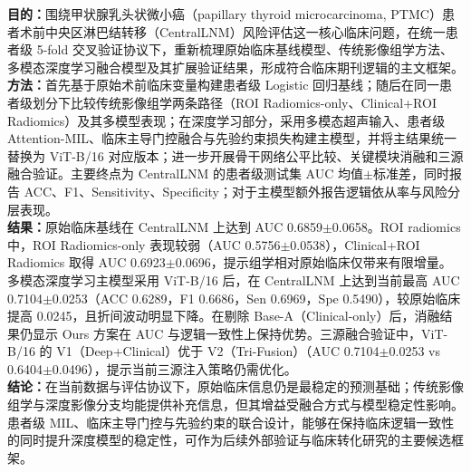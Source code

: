 \textbf{目的：}围绕甲状腺乳头状微小癌（papillary thyroid microcarcinoma, PTMC）患者术前中央区淋巴结转移（CentralLNM）风险评估这一核心临床问题，在统一患者级 5-fold 交叉验证协议下，重新梳理原始临床基线模型、传统影像组学方法、多模态深度学习融合模型及其扩展验证结果，形成符合临床期刊逻辑的主文框架。\\
\textbf{方法：}首先基于原始术前临床变量构建患者级 Logistic 回归基线；随后在同一患者级划分下比较传统影像组学两条路径（ROI Radiomics-only、Clinical+ROI Radiomics）及其多模型表现；在深度学习部分，采用多模态超声输入、患者级 Attention-MIL、临床主导门控融合与先验约束损失构建主模型，并将主结果统一替换为 ViT-B/16 对应版本；进一步开展骨干网络公平比较、关键模块消融和三源融合验证。主要终点为 CentralLNM 的患者级测试集 AUC 均值$\pm$标准差，同时报告 ACC、F1、Sensitivity、Specificity；对于主模型额外报告逻辑依从率与风险分层表现。\\
\textbf{结果：}原始临床基线在 CentralLNM 上达到 AUC 0.6859$\pm$0.0658。ROI radiomics 中，ROI Radiomics-only 表现较弱（AUC 0.5756$\pm$0.0538），Clinical+ROI Radiomics 取得 AUC 0.6923$\pm$0.0696，提示组学相对原始临床仅带来有限增量。多模态深度学习主模型采用 ViT-B/16 后，在 CentralLNM 上达到当前最高 AUC 0.7104$\pm$0.0253（ACC 0.6289，F1 0.6686，Sen 0.6969，Spe 0.5490），较原始临床提高 0.0245，且折间波动明显下降。在剔除 Base-A（Clinical-only）后，消融结果仍显示 Ours 方案在 AUC 与逻辑一致性上保持优势。三源融合验证中，ViT-B/16 的 V1（Deep+Clinical）优于 V2（Tri-Fusion）（AUC 0.7104$\pm$0.0253 vs 0.6404$\pm$0.0496），提示当前三源注入策略仍需优化。\\
\textbf{结论：}在当前数据与评估协议下，原始临床信息仍是最稳定的预测基础；传统影像组学与深度影像分支均能提供补充信息，但其增益受融合方式与模型稳定性影响。患者级 MIL、临床主导门控与先验约束的联合设计，能够在保持临床逻辑一致性的同时提升深度模型的稳定性，可作为后续外部验证与临床转化研究的主要候选框架。
